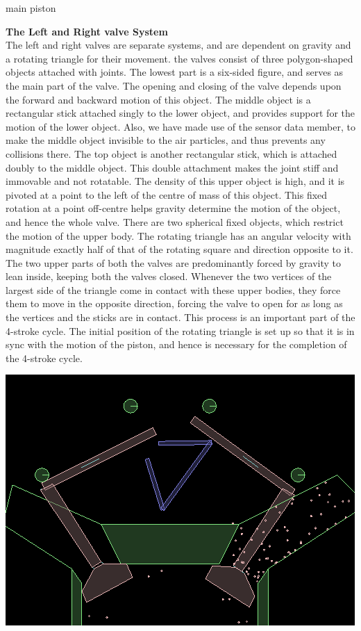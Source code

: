 \documentclass[40pt]{article}
\begin{document}
{\begin{description}
\begin{center}
\small{main piston}
\end{center}
    \item[$\bullet$ ] \textbf{The Left and Right valve System\\}
    The left and right valves are separate systems, and are dependent on gravity and a rotating triangle for their movement. the valves consist of three polygon-shaped objects attached with joints. The lowest part is a six-sided figure, and serves as the main part of the valve. The opening and closing of the valve depends upon the forward and backward motion of this object. The middle object is a rectangular stick attached singly to the lower object, and provides support for the motion of the lower object. Also, we have made use of the sensor data member, to make the middle object invisible to the air particles, and thus prevents any collisions there. The top object is another rectangular stick, which is attached doubly to the middle object. This double attachment makes the joint stiff and immovable and not rotatable. The density of this upper object is high, and it is pivoted at a point to the left of the centre of mass of this object. This fixed rotation at a point off-centre helps gravity determine the motion of the object, and hence the whole valve. There are two spherical fixed objects, which restrict the motion of the upper body.
The rotating triangle has an angular velocity with magnitude exactly half of that of the rotating square and direction opposite to it. The two upper parts of both the valves are predominantly forced by gravity to lean inside, keeping both the valves closed. Whenever the two vertices of the largest side of the triangle come in contact with these upper bodies, they force them to move in the opposite direction, forcing the valve to open for as long as the vertices and the sticks are in contact. This process is an important part of the 4-stroke cycle. The initial position of the rotating triangle is set up so that it is in sync with the motion of the piston, and hence is necessary for the completion of the 4-stroke cycle.\newline
\begin{center}
\includegraphics[scale=0.4]{valve.png}\newline

\end{center}
\end{description}}
\end{document}
